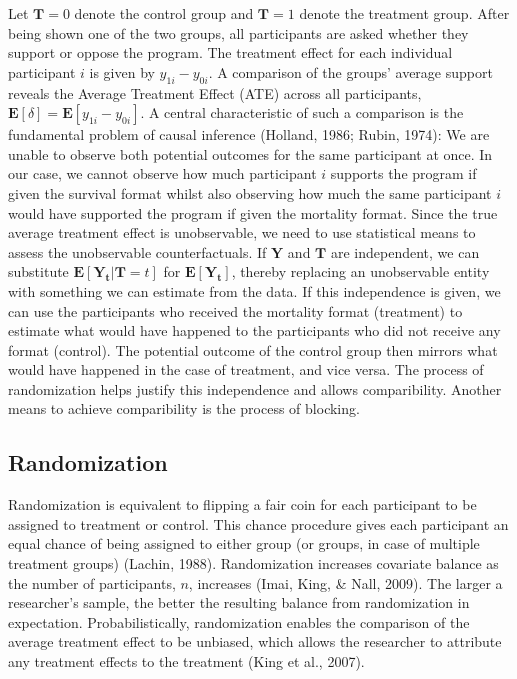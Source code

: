 \documentclass[12pt,econ]{sources/authesis}
\begin{document}
Let \(\bm{T}=0\) denote the control group and \(\bm{T}=1\) denote the treatment group. After being shown one of the two groups, all participants are asked whether they support or oppose the program. The treatment effect for each individual participant \(i\) is given by \(y_{1i} - y_{0i}\). A comparison of the groups' average support reveals the Average Treatment Effect (ATE) across all participants, \(\mathbf{E}[\delta] = \mathbf{E}[y_{1i} - y_{0i}]\). A central characteristic of such a comparison is the fundamental problem of causal inference (Holland, 1986; Rubin, 1974): We are unable to observe both potential outcomes for the same participant at once. In our case, we cannot observe how much participant \(i\) supports the program if given the survival format whilst also observing how much the same participant \(i\) would have supported the program if given the mortality format. Since the true average treatment effect is unobservable, we need to use statistical means to assess the unobservable counterfactuals. If \(\bm{Y}\) and \(\bm{T}\) are independent, we can substitute \(\mathbf{E}[\bm{Y_t}|\bm{T}=t]\) for \(\mathbf{E}[\bm{Y_t}]\), thereby replacing an unobservable entity with something we can estimate from the data. If this independence is given, we can use the participants who received the mortality format (treatment) to estimate what would have happened to the participants who did not receive any format (control). The potential outcome of the control group then mirrors what would have happened in the case of treatment, and vice versa. The process of randomization helps justify this independence and allows comparibility. Another means to achieve comparibility is the process of blocking.

\hypertarget{ordblock-theory-randomization}{%
\subsection{Randomization}\label{ordblock-theory-randomization}}

Randomization is equivalent to flipping a fair coin for each participant to be assigned to treatment or control. This chance procedure gives each participant an equal chance of being assigned to either group (or groups, in case of multiple treatment groups) (Lachin, 1988). Randomization increases covariate balance as the number of participants, \(n\), increases (Imai, King, \& Nall, 2009). The larger a researcher's sample, the better the resulting balance from randomization in expectation. Probabilistically, randomization enables the comparison of the average treatment effect to be unbiased, which allows the researcher to attribute any treatment effects to the treatment (King et al., 2007).
\end{document}
